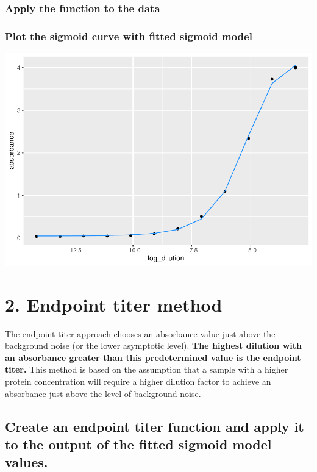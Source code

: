 \documentclass[
]{book}
\begin{document}
\hypertarget{apply-the-function-to-the-data}{%
\subsubsection{Apply the function to the data}\label{apply-the-function-to-the-data}}

\hypertarget{plot-the-sigmoid-curve-with-fitted-sigmoid-model}{%
\subsubsection{Plot the sigmoid curve with fitted sigmoid model}\label{plot-the-sigmoid-curve-with-fitted-sigmoid-model}}

\includegraphics{csu-impactb_files/figure-latex/unnamed-chunk-44-1.pdf}

\hypertarget{endpoint-titer-method}{%
\section{2. Endpoint titer method}\label{endpoint-titer-method}}

The endpoint titer approach chooses an absorbance value just above the background noise (or the lower asymptotic level). \textbf{The highest dilution with an absorbance greater than this predetermined value is the endpoint titer.} This method is based on the assumption that a sample with a higher protein concentration will require a higher dilution factor to achieve an absorbance just above the level of background noise.

\hypertarget{create-an-endpoint-titer-function-and-apply-it-to-the-output-of-the-fitted-sigmoid-model-values.}{%
\subsection{Create an endpoint titer function and apply it to the output of the fitted sigmoid model values.}\label{create-an-endpoint-titer-function-and-apply-it-to-the-output-of-the-fitted-sigmoid-model-values.}}
\end{document}
